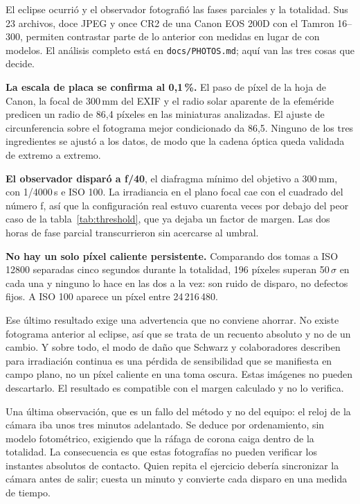 \documentclass[10pt,a4paper]{article}
\begin{document}
El eclipse ocurrió y el observador fotografió las fases parciales y la
totalidad. Sus 23 archivos, doce JPEG y once CR2 de una Canon EOS 200D con el
Tamron 16--300, permiten contrastar parte de lo anterior con medidas en lugar de
con modelos. El análisis completo está en \texttt{docs/PHOTOS.md}; aquí van las
tres cosas que decide.

\textbf{La escala de placa se confirma al 0,1\,\%.} El paso de píxel de la hoja
de Canon, la focal de 300\,mm del EXIF y el radio solar aparente de la efeméride
predicen un radio de 86,4 píxeles en las miniaturas analizadas. El ajuste de
circunferencia sobre el fotograma mejor condicionado da 86,5. Ninguno de los tres
ingredientes se ajustó a los datos, de modo que la cadena óptica queda validada
de extremo a extremo.

\textbf{El observador disparó a f/40}, el diafragma mínimo del objetivo a
300\,mm, con 1/4000\,s e ISO 100. La irradiancia en el plano focal cae con el
cuadrado del número f, así que la configuración real estuvo cuarenta veces por
debajo del peor caso de la tabla~\ref{tab:threshold}, que ya dejaba un factor
\marginA{} de margen. Las dos horas de fase parcial transcurrieron sin
acercarse al umbral.

\textbf{No hay un solo píxel caliente persistente.} Comparando dos tomas a
ISO 12800 separadas cinco segundos durante la totalidad, 196 píxeles superan
50\,$\sigma$ en cada una y ninguno lo hace en las dos a la vez: son ruido de
disparo, no defectos fijos. A ISO 100 aparece un píxel entre 24\,216\,480.

Ese último resultado exige una advertencia que no conviene ahorrar. No existe
fotograma anterior al eclipse, así que se trata de un recuento absoluto y no de
un cambio. Y sobre todo, el modo de daño que Schwarz y colaboradores describen
para irradiación continua es una pérdida de sensibilidad que se manifiesta en
campo plano, no un píxel caliente en una toma oscura. Estas imágenes no pueden
descartarlo. El resultado es compatible con el margen calculado y no lo verifica.

Una última observación, que es un fallo del método y no del equipo: el reloj de
la cámara iba unos tres minutos adelantado. Se deduce por ordenamiento, sin
modelo fotométrico, exigiendo que la ráfaga de corona caiga dentro de la
totalidad. La consecuencia es que estas fotografías no pueden verificar los
instantes absolutos de contacto. Quien repita el ejercicio debería sincronizar la
cámara antes de salir; cuesta un minuto y convierte cada disparo en una medida
de tiempo.
\end{document}
